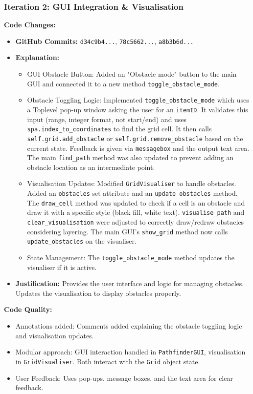 \newpage

\subsubsection{Iteration 2: GUI Integration \& Visualisation}

\textbf{Code Changes:}
\begin{itemize}
	\item \textbf{GitHub Commits:} \verb|d34c9b4...|, \verb|78c5662...|, \verb|a8b3b6d...|
	\item \textbf{Explanation:}
	\begin{itemize}
	    \item GUI Obstacle Button: Added an "Obstacle mode" button to the main GUI and connected it to a new method \verb|toggle_obstacle_mode|.
		\item Obstacle Toggling Logic: Implemented \verb|toggle_obstacle_mode| which uses a Toplevel pop-up window asking the user for an \verb|itemID|. It validates this input (range, integer format, not start/end) and uses \verb|spa.index_to_coordinates| to find the grid cell. It then calls \verb|self.grid.add_obstacle| or \verb|self.grid.remove_obstacle| based on the current state. Feedback is given via \verb|messagebox| and the output text area. The main \verb|find_path| method was also updated to prevent adding an obstacle location as an intermediate point.
		\item Visualisation Updates: Modified \verb|GridVisualiser| to handle obstacles. Added an \verb|obstacles| set attribute and an \verb|update_obstacles| method. The \verb|draw_cell| method was updated to check if a cell is an obstacle and draw it with a specific style (black fill, white text). \verb|visualise_path| and \verb|clear_visualisation| were adjusted to correctly draw/redraw obstacles considering layering. The main GUI's \verb|show_grid| method now calls \verb|update_obstacles| on the visualiser.
		\item State Management: The \verb|toggle_obstacle_mode| method updates the visualiser if it is active.
	\end{itemize}
	\item \textbf{Justification:} Provides the user interface and logic for managing obstacles. Updates the visualisation to display obstacles properly.
\end{itemize}

\textbf{Code Quality:}
\begin{itemize}
	\item Annotations added: Comments added explaining the obstacle toggling logic and visualisation updates.
	\item Modular approach: GUI interaction handled in \verb|PathfinderGUI|, visualisation in \verb|GridVisualiser|. Both interact with the \verb|Grid| object state.
	\item User Feedback: Uses pop-ups, message boxes, and the text area for clear feedback.
\end{itemize}

